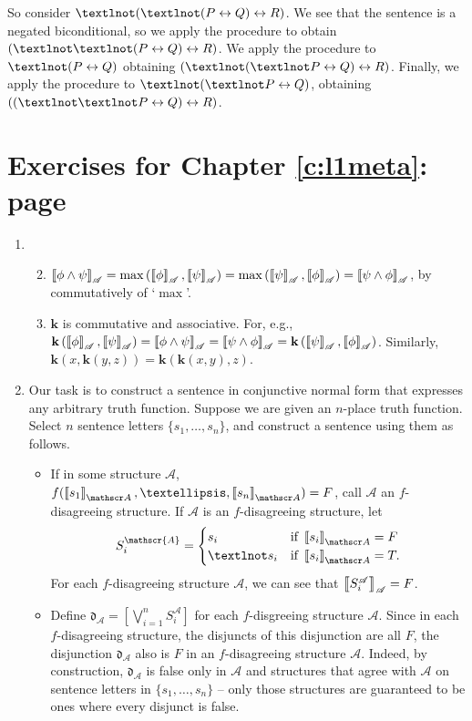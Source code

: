 {\begin{enumerate}
So consider $¬(¬(P\bicond Q)\bicond R)$. We see that the sentence is a negated biconditional, so we apply the procedure to obtain $(¬¬(P \bicond Q) \bicond R)$. We apply the procedure to $¬(P\bicond Q)$ obtaining $(¬(¬P \bicond Q)\bicond R)$. Finally, we apply the procedure to $¬(¬P \bicond Q)$, obtaining $((¬¬P \bicond Q) \bicond R)$.

\end{enumerate}

\section*{Exercises for Chapter \ref{c:l1meta}: page \pageref{ex5}} \label{ans5}

\begin{enumerate}
\item \begin{enumerate}\setcounter{enumii}{1}
	\item 	$\left\llbracket \phi \wedge \psi\right\rrbracket_{\mathscr{A}} = \max\left(\left\llbracket \phi\right\rrbracket_{\mathscr{A}},\left\llbracket \psi\right\rrbracket_{\mathscr{A}}\right) = \max\left(\left\llbracket \psi\right\rrbracket_{\mathscr{A}},\left\llbracket \phi\right\rrbracket_{\mathscr{A}}\right) = \left\llbracket \psi\wedge \phi\right\rrbracket_{\mathscr{A}}$, by commutatively of `$\max$'. 
	\item $\mathbf{k}$ is commutative and associative. For, e.g., $\mathbf{k}\left(\left\llbracket \phi\right\rrbracket_{\mathscr{A}},\left\llbracket \psi\right\rrbracket_{\mathscr{A}}\right) = \left\llbracket \phi \wedge \psi\right\rrbracket_{\mathscr{A}} = \left\llbracket \psi \wedge \phi\right\rrbracket_{\mathscr{A}} = \mathbf{k}\left(\left\llbracket \psi\right\rrbracket_{\mathscr{A}},\left\llbracket \phi\right\rrbracket_{\mathscr{A}}\right)$. Similarly, $\mathbf{k}(x,\mathbf{k}(y,z)) = \mathbf{k}(\mathbf{k}(x,y),z)$.
\end{enumerate}\setcounter{enumi}{3}
\item Our task is to construct a sentence in conjunctive normal form that expresses any arbitrary truth function. Suppose we are given an $n$-place truth function. Select $n$ sentence letters $\{s_{1},…,s_{n}\}$, and construct a sentence using them as follows. \begin{itemize}
	\item If in some structure $\mathscr{A}$, $f(\val{s_{1}}{A},…,\val{s_{n}}{A}) = F$, call $\mathscr{A}$ an $f$-disagreeing structure. If $\mathscr{A}$ is an $f$-disagreeing structure, let $$S^{\mathscr{A}}_{i} = \begin{cases}
		s_{i} &\text{if } \val{s_{i}}{A} = F\\	
		¬s_{i} &\text{if } \val{s_{i}}{A} = T.
	\end{cases}$$ For each $f$-disagreeing structure $\mathscr{A}$, we can see that $\left\llbracket S_{i}^{\mathscr{A}}\right\rrbracket_{\mathscr{A}} = F$.
	\item Define $\mathfrak{d}_{\mathscr{A}} = \left[\bigvee_{i=1}^{n}S^{\mathscr{A}}_{i}\right]$ for each $f$-disgreeing structure $\mathscr{A}$. Since in each $f$-disagreeing structure, the disjuncts of this disjunction are all $F$, the disjunction $\mathfrak{d}_{\mathscr{A}}$ also is $F$ in an $f$-disagreeing structure $\mathscr{A}$. Indeed, by construction, $\mathfrak{d}_{\mathscr{A}}$ is false only in $\mathscr{A}$ and structures that agree with $\mathscr{A}$ on sentence letters in $\{s_{1},…,s_{n}\}$ – only those structures are guaranteed to be ones where every disjunct is false. 


\end{itemize}
\end{enumerate}}
